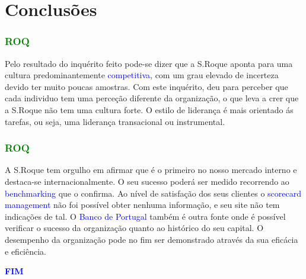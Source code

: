 \section{Conclusões}
\begin{frame}
\frametitle{\textcolor{green}{ROQ}}
Pelo resultado do inquérito feito pode-se dizer que a S.Roque aponta para uma cultura predominantemente \textcolor{blue}{competitiva}, com um grau elevado de incerteza devido ter muito poucas amostras. Com este inquérito, deu para perceber que cada individuo tem uma perceção diferente da organização, o que leva a crer que a S.Roque não tem uma cultura forte. O estilo de liderança é mais orientado ás tarefas, ou seja, uma liderança transacional ou instrumental.
\end{frame}
\begin{frame}
\frametitle{\textcolor{green}{ROQ}}
A S.Roque tem orgulho em afirmar que é o primeiro no nosso mercado interno e destaca-se internacionalmente. O seu sucesso poderá ser medido recorrendo ao \textcolor{blue}{benchmarking} que o confirma. Ao nível de satisfação dos seus clientes o \textcolor{blue}{scorecard management} não foi possível obter nenhuma informação, e seu site não tem indicações de tal. O \textcolor{blue}{Banco de Portugal} também é outra fonte onde é possível verificar o sucesso da organização quanto ao histórico do seu capital. O desempenho da organização pode no fim ser demonstrado através da sua eficácia e eficiência.\\
\end{frame}
\begin{frame}
\centering
\Huge \textcolor{blue}{\textbf{FIM}}
\end{frame}

